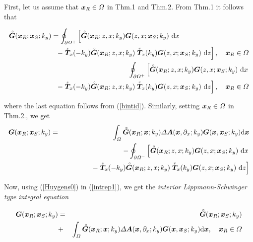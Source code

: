 First, let us assume that ${\bmi x}_{R}\in {\mit \Omega}$ in Thm.1 and Thm.2. From
Thm.1 it follows that
\begin{samepage}
\begin{eqnarray} \label{Huygens0}
\lefteqn{
{\rf{\bmi G}}({\bmi x}_{R};{\bmi x}_{S};k_y)=
\oint_{\partial {\mit \Omega}^{+}} \left[ {\rf{\bmi G}}({\bmi x}_{R};{z, x};k_y) 
{{\bmi G}}({z, x};{\bmi x}_{S};k_y) \  {\rm d}x \right.}\nonumber\\
&&
\qquad\qquad\qquad
- \left.\stackrel{\scriptscriptstyle _s}{\bmi T}{}_{\!\!\! x}(-k_y){\rf{\bmi 
G}}({\bmi x}_{R};{z, x};k_y)  
\stackrel{\scriptscriptstyle _r}{\bmi T}{}_{\!\!\! x}(k_y){{\bmi G}}({z, 
x};{\bmi x}_{S};k_y) \ {\rm d}z \right],\quad {\bmi x}_{R}\in {\mit 
\Omega}\nonumber\\
&&
\qquad\qquad\qquad
\oint_{\partial {\mit \Omega}^{+}} \left[ {\rf{\bmi G}}({\bmi x}_{R};{z, x};k_y) 
{{\bmi G}}({z, x};{\bmi x}_{S};k_y) \  {\rm d}x \right.\\
&&
\qquad\qquad\qquad
- \left.\stackrel{\scriptscriptstyle _s}{\bmi T}{}_{\!\!\! x}(-k_y){\rf{\bmi 
G}}({\bmi x}_{R};{z, x};k_y)  
\stackrel{\scriptscriptstyle _r}{\bmi T}{}_{\!\!\! x}(k_y){{\bmi G}}({z, 
x};{\bmi x}_{S};k_y) \ {\rm d}z \right],\quad {\bmi x}_{R}\in {\mit 
\Omega}\nonumber
\end{eqnarray}
\end{samepage}
where the last equation follows from (\ref{bintid}).
Similarly, setting 
${\bmi x}_{R}\in {\mit \Omega}$ in Thm.2., we get
\begin{eqnarray} \label{intrep1}
{{\bmi G}}({\bmi x}_{R};{\bmi x}_{S};k_y)
&=&\int_{{\mit \Omega}} {\rf{\bmi G}}({\bmi x}_{R};{\bmi x};k_y)
{\mit \Delta} {\bmi A}({\bmi
x},\partial_{x};k_y) {\bmi G}({\bmi x},{\bmi x}_{S};k_y) {\rm d}{\bmi x}\nonumber\\
&&
-\oint_{\partial {\mit \Omega}^{-}} \left[ {\rf{\bmi G}}({\bmi x}_{R};{z, x};k_y) 
{{\bmi G}}({z, x};{\bmi x}_{S};k_y) \  {\rm d}x \right.\\
&&
\qquad\qquad
- \left.\stackrel{\scriptscriptstyle _s}{\bmi T}{}_{\!\!\! x}(-k_y){\rf{\bmi 
G}}({\bmi x}_{R};{z, x};k_y)  
\stackrel{\scriptscriptstyle _r}{\bmi T}{}_{\!\!\! x}(k_y){{\bmi G}}({z, 
x};{\bmi x}_{S};k_y) \ {\rm d}z \right]\nonumber
\end{eqnarray}

Now, using (\ref{Huygens0}) in (\ref{intrep1}), we get the {\em interior 
Lippmann-Schwinger type integral equation\/}
\begin{samepage}
\begin{eqnarray} \label{LSinterior}
{{\bmi G}}({\bmi x}_{R};{\bmi x}_{S};k_y)&=&
{\rf{\bmi G}}({\bmi x}_{R};{\bmi x}_{S};k_y)\nonumber\\
&+&\int_{{\mit \Omega}} {\rf{\bmi G}}({\bmi x}_{R};{\bmi x};k_y)
{\mit \Delta} {\bmi A}({\bmi
x},\partial_{x};k_y) {\bmi G}({\bmi x},{\bmi x}_{S};k_y) {\rm d}{\bmi x},
\quad {\bmi x}_{R}\in {\mit \Omega}
\end{eqnarray}
\end{samepage}

